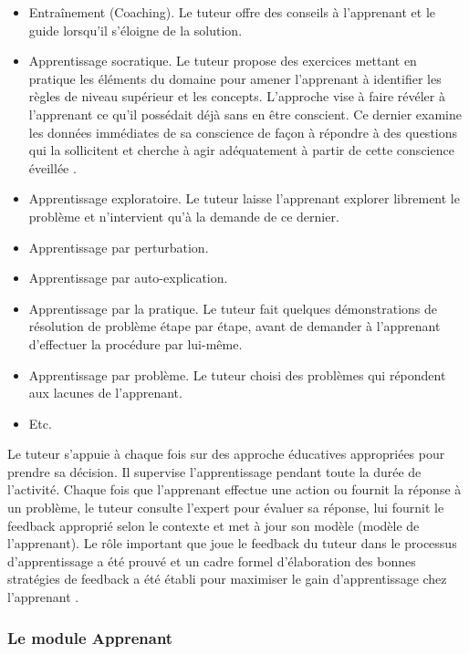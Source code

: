 \begin{itemize}
    \item Entraînement (Coaching). Le tuteur offre des conseils à l'apprenant et le guide lorsqu'il s'éloigne de la solution.
    \item Apprentissage socratique. Le tuteur propose des exercices mettant en pratique les éléments du domaine pour amener l'apprenant à identifier les règles
de niveau supérieur et les concepts. L'approche vise à faire révéler à l'apprenant ce qu'il possédait déjà sans en être conscient. Ce dernier examine les données immédiates de sa conscience de façon à répondre à des questions
qui la sollicitent et cherche à agir adéquatement à partir de cette conscience
éveillée .
    \item Apprentissage exploratoire. Le tuteur laisse l'apprenant explorer librement
le problème et n'intervient qu'à la demande de ce dernier.
    \item Apprentissage par perturbation.
    \item Apprentissage par auto-explication.
    \item Apprentissage par la pratique. Le tuteur fait quelques démonstrations de
résolution de problème étape par étape, avant de demander à l'apprenant d'effectuer la procédure par lui-même.
    \item Apprentissage par problème. Le tuteur choisi des problèmes qui répondent aux lacunes de l'apprenant.
    \item Etc.
\end{itemize}

Le tuteur s'appuie à chaque fois sur des approche éducatives appropriées pour prendre sa décision. Il supervise l'apprentissage pendant toute la durée de l'activité. Chaque fois que l'apprenant effectue une action ou fournit la réponse à un problème, le tuteur consulte l'expert pour évaluer sa réponse, lui fournit le
feedback approprié selon le contexte et met à jour son modèle (modèle de l'apprenant). Le rôle important que joue le feedback du tuteur dans le processus d'apprentissage a été prouvé et un cadre formel d'élaboration des bonnes stratégies de feedback \cite{narciss2008feedback} a été établi pour maximiser le gain d'apprentissage chez l'apprenant .


\subsubsection{Le module Apprenant}

